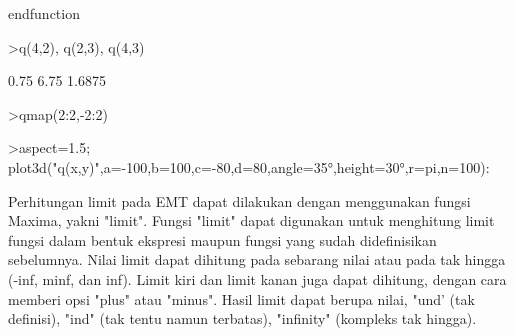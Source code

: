 \documentclass[a4paper,10pt]{article}
\begin{document}
\begin{eulernotebook}
\begin{eulercomment}
\begin{eulercomment}
\begin{eulercomment}
\begin{eulercomment}
\begin{eulercomment}
\begin{eulercomment}
\begin{eulercomment}
\begin{eulercomment}
\begin{eulercomment}
\begin{eulercomment}
\begin{eulerudf}
  endfunction
\end{eulerudf}
\begin{eulerprompt}
>q(4,2), q(2,3), q(4,3)
\end{eulerprompt}
\begin{euleroutput}
  0.75
  6.75
  1.6875
\end{euleroutput}
\begin{eulerprompt}
>qmap(2:2,-2:2)
\end{eulerprompt}
\begin{euleroutput}
  [3,  0.75,  0,  0.75,  3]
\end{euleroutput}
\begin{eulerprompt}
>aspect=1.5; plot3d("q(x,y)",a=-100,b=100,c=-80,d=80,angle=35°,height=30°,r=pi,n=100):
\end{eulerprompt}
\begin{eulercomment}
Perhitungan limit pada EMT dapat dilakukan dengan menggunakan fungsi
Maxima, yakni "limit". Fungsi "limit" dapat digunakan untuk menghitung
limit fungsi dalam bentuk ekspresi maupun fungsi yang sudah
didefinisikan sebelumnya. Nilai limit dapat dihitung pada sebarang
nilai atau pada tak hingga (-inf, minf, dan inf). Limit kiri dan limit
kanan juga dapat dihitung, dengan cara memberi opsi "plus" atau
"minus". Hasil limit dapat berupa nilai, "und' (tak definisi), "ind"
(tak tentu namun terbatas), "infinity" (kompleks tak hingga).


\end{eulercomment}
\end{eulercomment}
\end{eulercomment}
\end{eulercomment}
\end{eulercomment}
\end{eulercomment}
\end{eulercomment}
\end{eulercomment}
\end{eulercomment}
\end{eulercomment}
\end{eulercomment}
\end{eulernotebook}
\end{document}
